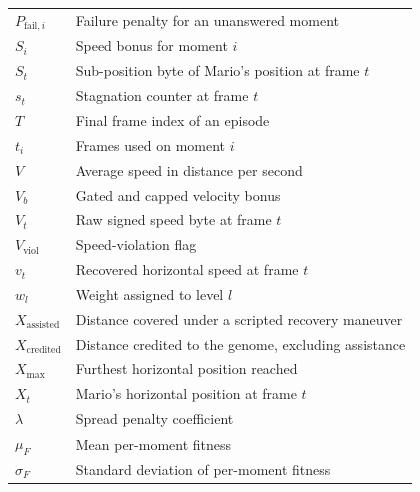 \begin{longtable}{@{}p{}p{}@{}}
$P_{\text{fail},i}$  & Failure penalty for an unanswered moment \\
$S_{i}$              & Speed bonus for moment $i$ \\
$S_{t}$              & Sub-position byte of Mario's position at frame $t$ \\
$s_{t}$              & Stagnation counter at frame $t$ \\
$T$                  & Final frame index of an episode \\
$t_{i}$              & Frames used on moment $i$ \\
$V$                  & Average speed in distance per second \\
$V_{b}$              & Gated and capped velocity bonus \\
$V_{t}$              & Raw signed speed byte at frame $t$ \\
$V_{\text{viol}}$    & Speed-violation flag \\
$v_{t}$              & Recovered horizontal speed at frame $t$ \\
$w_{l}$              & Weight assigned to level $l$ \\
$X_{\text{assisted}}$ & Distance covered under a scripted recovery maneuver \\
$X_{\text{credited}}$ & Distance credited to the genome, excluding assistance \\
$X_{\max}$           & Furthest horizontal position reached \\
$X_{t}$              & Mario's horizontal position at frame $t$ \\
$\lambda$            & Spread penalty coefficient \\
$\mu_{F}$            & Mean per-moment fitness \\
$\sigma_{F}$         & Standard deviation of per-moment fitness \\
\end{longtable}

\clearpage

